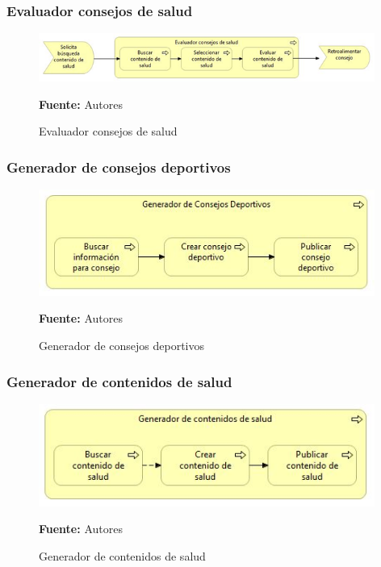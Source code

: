 \subsubsection{Evaluador consejos de salud}

\begin{figure}[!htb]
  \begin{center}
    \includegraphics[width=11cm]{./imagenes/business_process/evaluadorconsejossalud.png}
    \caption{Evaluador consejos de salud}
    \label{fig:BP_EvaluadorConsejosSalud}
    \textbf{Fuente:}  Autores
  \end{center}
\end{figure}

\subsubsection{Generador de consejos deportivos}

\begin{figure}[!htb]
  \begin{center}
    \includegraphics[width=11cm]{./imagenes/business_process/generadorconsejosdeportivos.png}
    \caption{Generador de consejos deportivos}
    \label{fig:BP_GeneradorConsejosDeportivos}
    \textbf{Fuente:}  Autores
  \end{center}
\end{figure}

\subsubsection{Generador de contenidos de salud}

\begin{figure}[!htb]
  \begin{center}
    \includegraphics[width=11cm]{./imagenes/business_process/generadorcontenidossalud.png}
    \caption{Generador de contenidos de salud}
    \label{fig:BP_GeneradorContenidosSalud}
    \textbf{Fuente:}  Autores
  \end{center}
\end{figure}

